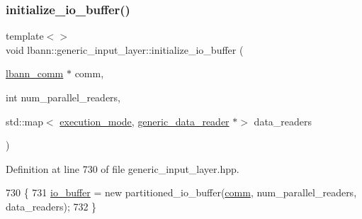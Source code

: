 \subsubsection{\texorpdfstring{initialize\+\_\+io\+\_\+buffer()}{initialize\_io\_buffer()}\hspace{0.1cm}{\footnotesize\ttfamily [2/3]}}
{\footnotesize\ttfamily template$<$$>$ \\
void lbann\+::generic\+\_\+input\+\_\+layer\+::initialize\+\_\+io\+\_\+buffer (\begin{DoxyParamCaption}\item[{\hyperlink{classlbann_1_1lbann__comm}{lbann\+\_\+comm} $\ast$}]{comm,  }\item[{int}]{num\+\_\+parallel\+\_\+readers,  }\item[{std\+::map$<$ \hyperlink{base_8hpp_a2781a159088df64ed7d47cc91c4dc0a8}{execution\+\_\+mode}, \hyperlink{classlbann_1_1generic__data__reader}{generic\+\_\+data\+\_\+reader} $\ast$$>$}]{data\+\_\+readers }\end{DoxyParamCaption})\hspace{0.3cm}{\ttfamily [inline]}}



Definition at line 730 of file generic\+\_\+input\+\_\+layer.\+hpp.


\begin{DoxyCode}
730                                                                                                            
                                                                                         \{
731   \hyperlink{classlbann_1_1generic__input__layer_a9dfe8b9afaebc7a5bcb0177ee2ab428f}{io\_buffer} = \textcolor{keyword}{new} partitioned\_io\_buffer(\hyperlink{file__io_8cpp_ab048c6f9fcbcfaa57ce68b00263dbebe}{comm}, num\_parallel\_readers, data\_readers);
732 \}
\end{DoxyCode}
\mbox{\label{classlbann_1_1generic__input__layer_ab0afac3b3a3ee9e7af81c0885d233756}} 
